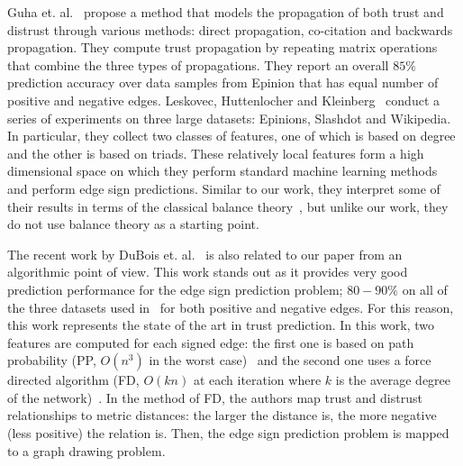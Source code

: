 \documentclass[acmtweb]{acmsmall}
\begin{document}
Guha et. al.~\cite{Guha:04} propose a method that models the
propagation of both trust and distrust through various methods: direct
propagation, co-citation and backwards propagation. They compute trust
propagation by repeating matrix operations that combine the three
types of propagations. They report an overall $85\%$ prediction
accuracy over data samples from Epinion that has equal number of
positive and negative edges.  Leskovec, Huttenlocher and
Kleinberg~\cite{Leskovec:2010} conduct a series of experiments on
three large datasets: Epinions, Slashdot and Wikipedia. In particular,
they collect two classes of features, one of which is based on degree
and the other is based on triads. These relatively local features form
a high dimensional space on which they perform standard machine
learning methods and perform edge sign predictions. Similar to our
work, they interpret some of their results in terms of the classical
balance theory~\cite{Cartwright:56}, but unlike our work, they do not
use balance theory as a starting point.

The recent work by DuBois et. al.~\cite{golbeck:distrust2011} is also
related to our paper from an algorithmic point of view. This work
stands out as it provides very good prediction performance for the
edge sign prediction problem; $80-90 \%$ on all of the three datasets
used in~\cite{Leskovec:2010} for both positive and negative edges. For
this reason, this work represents the state of the art in trust
prediction. In this work, two features are computed for each signed
edge: the first one is based on path probability (PP, $O(n^3)$ in the
worst case)~\cite{DuBois:2009} and the second one uses a force
directed algorithm (FD, $O(kn)$ at each iteration where $k$ is the
average degree of the network)~\cite{golbeck:distrust2011}. In the
method of FD, the authors map trust and distrust relationships to
metric distances: the larger the distance is, the more negative (less
positive) the relation is. Then, the edge sign prediction problem is
mapped to a graph drawing problem. 
\end{document}
